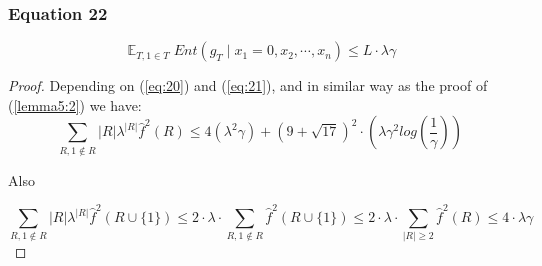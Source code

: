 \documentclass{article}
\begin{document}
			\subsubsection{Equation 22}
				\begin{equation}
					\mathop{\mathbb{E}}_{T,1 \in T} Ent \left( g_T \mid x_1 = 0,x_2, \cdots, x_n \right) \leq L \cdot \lambda \gamma
				\end{equation}
            
			\begin{proof}
				Depending on (\ref{eq:20}) and (\ref{eq:21}), and in similar way as the proof of (\ref{lemma5:2}) we have:
				\begin{equation} \label{boundForR}
					\sum_{R, 1 \notin R} |R| \lambda^{|R|} \hat{f}^2(R) 
					\leq 4 ( \lambda^2 \gamma ) + \left( 9 + \sqrt{17} \right)^2 \cdot \left( \lambda \gamma^2 log \left( \frac{1}{\gamma} \right) \right)
				\end{equation}

				Also
				
				\begin{equation} \label{boundForR+1}
					\sum_{R, 1 \notin R} |R| \lambda^{|R|} \hat{f}^2(R \cup \{1\}) 
					\leq 2 \cdot \lambda \cdot \sum_{R, 1 \notin R} \hat{f}^2(R \cup \{1\})
					\leq 2 \cdot \lambda \cdot \sum_{|R| \geq 2} \hat{f}^2(R)
					\leq 4 \cdot \lambda \gamma
				\end{equation}
				

\end{proof}
\end{document}
